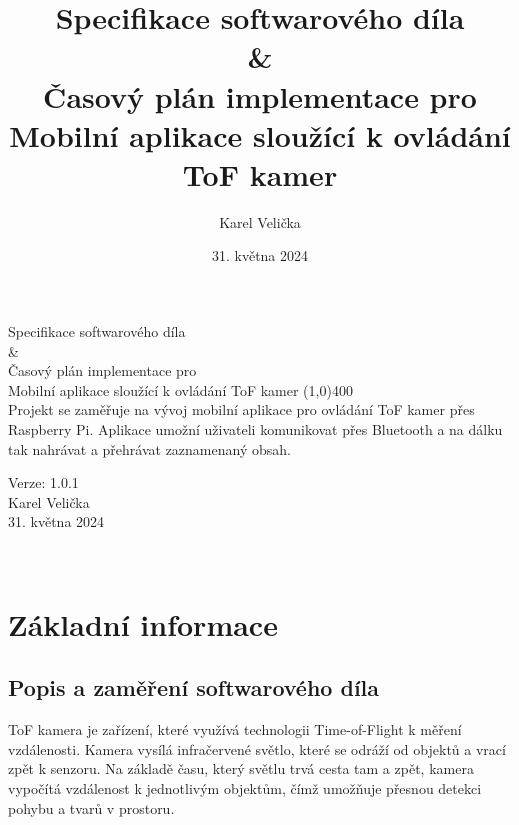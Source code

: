 \documentclass[12pt,a4paper]{article}
\title{Specifikace softwarového díla\\ \&\\ Časový plán implementace pro\\ \LARGE{Mobilní aplikace sloužící k ovládání ToF kamer}}
\date{31. května 2024}
\author{\sc Karel Velička}
\begin{document}
\thispagestyle{empty} 	%
\begin{center}
    {\LARGE Specifikace softwarového díla\\ \&\\ Časový plán implementace pro\\[5mm] Mobilní aplikace sloužící k ovládání ToF kamer}
    \line(1,0){400}\\ [10mm]
    
    {\large Projekt se zaměřuje na vývoj mobilní aplikace pro ovládání ToF kamer přes Raspberry Pi.
    Aplikace umožní uživateli komunikovat přes Bluetooth a na dálku tak nahrávat a přehrávat zaznamenaný obsah.} %
    
    \vfill    


    Verze: 1.0.1 \\[10mm]
    \sc Karel Velička\\ [10mm]
    31. května 2024
    
    ~ \\ [1cm]
    \end{center}

\begin{center}
    
\end{center}

\begin{center}
   
\end{center}

\newpage
\tableofcontents


\newpage


\section{Základní informace}

\subsection{Popis a zaměření softwarového díla}

ToF kamera je zařízení, které využívá technologii Time-of-Flight k měření vzdálenosti. 
Kamera vysílá infračervené světlo, které se odráží od objektů a vrací zpět k senzoru. 
Na základě času, který světlu trvá cesta tam a zpět, kamera vypočítá vzdálenost k jednotlivým objektům, čímž umožňuje přesnou detekci pohybu a tvarů v prostoru.
\end{document}
